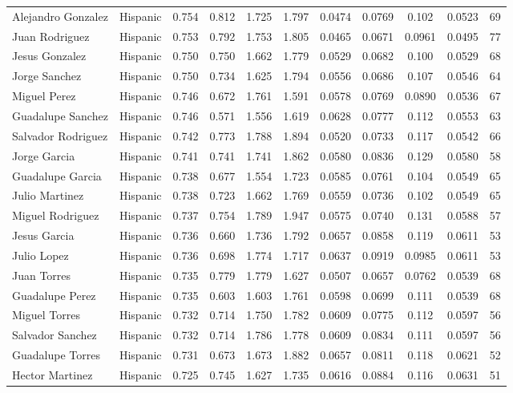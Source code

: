 \documentclass[]{article}
\begin{document}
\begin{tabular}{lcccccccccc}
Alejandro Gonzalez & Hispanic & 0.754 & 0.812 & 1.725 & 1.797 & 0.0474 & 0.0769 & 0.102 & 0.0523 & 69 \\
Juan Rodriguez & Hispanic & 0.753 & 0.792 & 1.753 & 1.805 & 0.0465 & 0.0671 & 0.0961 & 0.0495 & 77 \\
Jesus Gonzalez & Hispanic & 0.750 & 0.750 & 1.662 & 1.779 & 0.0529 & 0.0682 & 0.100 & 0.0529 & 68 \\
Jorge Sanchez & Hispanic & 0.750 & 0.734 & 1.625 & 1.794 & 0.0556 & 0.0686 & 0.107 & 0.0546 & 64 \\
Miguel Perez & Hispanic & 0.746 & 0.672 & 1.761 & 1.591 & 0.0578 & 0.0769 & 0.0890 & 0.0536 & 67 \\
Guadalupe Sanchez & Hispanic & 0.746 & 0.571 & 1.556 & 1.619 & 0.0628 & 0.0777 & 0.112 & 0.0553 & 63 \\
Salvador Rodriguez & Hispanic & 0.742 & 0.773 & 1.788 & 1.894 & 0.0520 & 0.0733 & 0.117 & 0.0542 & 66 \\
Jorge Garcia & Hispanic & 0.741 & 0.741 & 1.741 & 1.862 & 0.0580 & 0.0836 & 0.129 & 0.0580 & 58 \\
Guadalupe Garcia & Hispanic & 0.738 & 0.677 & 1.554 & 1.723 & 0.0585 & 0.0761 & 0.104 & 0.0549 & 65 \\
Julio Martinez & Hispanic & 0.738 & 0.723 & 1.662 & 1.769 & 0.0559 & 0.0736 & 0.102 & 0.0549 & 65 \\
Miguel Rodriguez & Hispanic & 0.737 & 0.754 & 1.789 & 1.947 & 0.0575 & 0.0740 & 0.131 & 0.0588 & 57 \\
Jesus Garcia & Hispanic & 0.736 & 0.660 & 1.736 & 1.792 & 0.0657 & 0.0858 & 0.119 & 0.0611 & 53 \\
Julio Lopez & Hispanic & 0.736 & 0.698 & 1.774 & 1.717 & 0.0637 & 0.0919 & 0.0985 & 0.0611 & 53 \\
Juan Torres & Hispanic & 0.735 & 0.779 & 1.779 & 1.627 & 0.0507 & 0.0657 & 0.0762 & 0.0539 & 68 \\
Guadalupe Perez & Hispanic & 0.735 & 0.603 & 1.603 & 1.761 & 0.0598 & 0.0699 & 0.111 & 0.0539 & 68 \\
Miguel Torres & Hispanic & 0.732 & 0.714 & 1.750 & 1.782 & 0.0609 & 0.0775 & 0.112 & 0.0597 & 56 \\
Salvador Sanchez & Hispanic & 0.732 & 0.714 & 1.786 & 1.778 & 0.0609 & 0.0834 & 0.111 & 0.0597 & 56 \\
Guadalupe Torres & Hispanic & 0.731 & 0.673 & 1.673 & 1.882 & 0.0657 & 0.0811 & 0.118 & 0.0621 & 52 \\
Hector Martinez & Hispanic & 0.725 & 0.745 & 1.627 & 1.735 & 0.0616 & 0.0884 & 0.116 & 0.0631 & 51 \\

\end{tabular}
\end{document}
